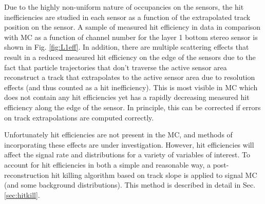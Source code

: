 Due to the highly non-uniform nature of occupancies on the sensors, the hit inefficiencies are studied in each sensor as a function of the extrapolated track position on the sensor. %
A sample of measured hit efficiency in data in comparison with MC as a function of channel number for the layer 1 bottom stereo sensor is shown in Fig. \ref{fig:L1eff}. In addition, there are multiple scattering effects that result in a reduced measured hit efficiency on the edge of the sensors due to the fact that particle trajectories that don't traverse the active sensor area reconstruct a track that extrapolates to the active sensor area due to resolution effects (and thus counted as a hit inefficiency). This is most visible in MC which does not contain any hit efficiencies yet has a rapidly decreasing measured hit efficiency along the edge of the sensor. In principle, this can be corrected if errors on track extrapolations are computed correctly.

Unfortunately hit efficiencies are not present in the MC, and methods of incorporating these effects are under investigation. However, hit efficiencies will affect the signal rate and distributions for a variety of variables of interest. To account for hit efficiencies in both a simple and reasonable way, a post-reconstruction hit killing algorithm based on track slope is applied to signal MC (and some background distributions). This method is described in detail in Sec. \ref{sec:hitkill}. 



